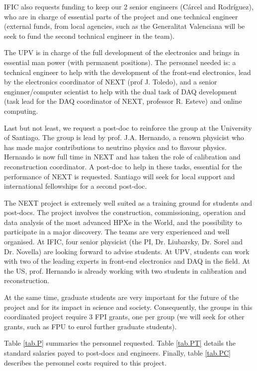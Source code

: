 IFIC also requests funding to keep our 2 senior engineers (C\'arcel and Rodr\'iguez), who are in charge of essential parts of the project and one technical engineer (external funds, from local agencies, such as the Generalitat Valenciana will be seek to fund the second technical engineer in the team). 

The UPV is in charge of the full development of the electronics and brings in essential man power (with permanent positions). The personnel needed is: a technical engineer to help with the development of the front-end electronics, lead by the electronics coordinator of NEXT (prof J. Toledo), and a senior enginner/computer scientist to help with the dual task of DAQ development (task lead for the DAQ coordinator of NEXT, professor R. Esteve) and online computing.  

Last but not least, we request a post-doc to reinforce the group at the University of Santiago. The group is lead by prof. J.A. Hernando, a renown physicist who has made major contributions to neutrino physics and to flavour physics. Hernando is now full time in NEXT and has taken the role of calibration and reconstruction coordinator. A post-doc to help in these tasks, essential for the performance of NEXT is requested. Santiago will seek for local support and international fellowships for a second post-doc.

The NEXT project is extremely well suited as a training ground for students and post-docs. The project involves the construction, commissioning, operation and data analysis of the most advanced HPXe in the World, and the possibility to participate in a major discovery. The teams are very experienced and well organised. At IFIC, four senior physicist (the PI, Dr. Liubarsky, Dr. Sorel and Dr. Novella) are looking forward to advise students. At UPV, students can work with two of the leading experts in front-end electronics and DAQ in the field. At the US, prof. Hernando is already working with two students in calibration and reconstruction.

At the same time, graduate students are very important for the future of the project and for its impact in science and society. Consequently, the groups in this coordinated project require 3 FPI grants, one per group (we will seek for other grants, such as FPU to enrol further graduate students). 

Table \ref{tab.P} summaries the personnel requested. Table \ref{tab.PT} details the standard salaries
payed to post-docs and engineers. Finally, table \ref{tab.PC} describes the personnel costs required to this project.

